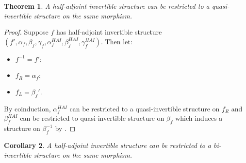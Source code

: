 \documentclass{article}
\newtheorem{theorem}{Theorem} \newtheorem{prop}[theorem]{Proposition}
\newtheorem{cor}[theorem]{Corollary}
\newcommand{\inv}[1]{#1^{-1}} \newcommand{\comp}{\star}
\begin{document}
\begin{theorem}
  A half-adjoint invertible structure can be restricted to a
  quasi-invertible structure on the same morphism.
\end{theorem}
\begin{proof}
  Suppose \(f\) has half-adjoint invertible structure \((f',
  \alpha_f, \beta_f, \gamma_f, \alpha_f^{HAI}, \beta_f^{HAI},
  \gamma_f^{HAI})\). Then let:
  \begin{itemize}
  \item \(\inv f = {f'}\);
  \item \(f_R = \alpha_f\);
  \item \(f_L = \beta_f'\).
  \end{itemize}
  By coinduction, \(\alpha_f^{HAI}\) can be restricted to a
  quasi-invertible structure on \(f_R\) and \(\beta_f^{HAI}\) can be
  restricted to quasi-invertible structure on \(\beta_f\) which
  induces a structure on \(\inv {\beta_f}\) by .
\end{proof}

\begin{cor}
  A half-adjoint invertible structure can be restricted to a
  bi-invertible structure on the same morphism.
\end{cor}
\end{document}
